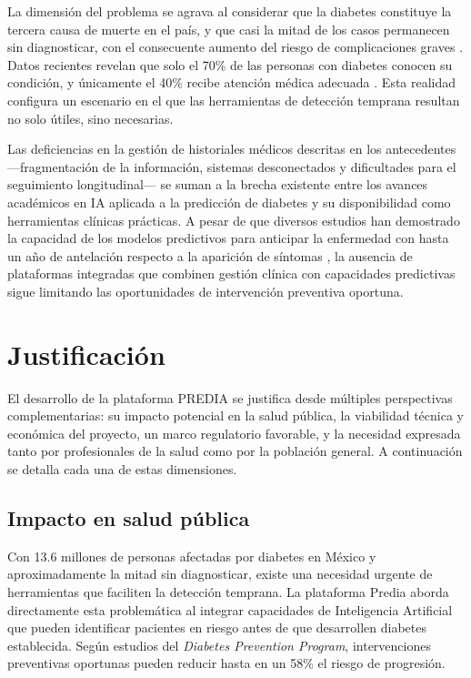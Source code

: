 \documentclass[12pt, letterpaper, twoside]{report}
\begin{document}
La dimensión del problema se agrava al considerar que la diabetes constituye la tercera causa de muerte en el país, y que casi la mitad de los casos permanecen sin diagnosticar, con el consecuente aumento del riesgo de complicaciones graves \citep{basto2021}. Datos recientes revelan que solo el 70\% de las personas con diabetes conocen su condición, y únicamente el 40\% recibe atención médica adecuada \citep{barquera2021}. Esta realidad configura un escenario en el que las herramientas de detección temprana resultan no solo útiles, sino necesarias.

Las deficiencias en la gestión de historiales médicos descritas en los antecedentes ---fragmentación de la información, sistemas desconectados y dificultades para el seguimiento longitudinal--- se suman a la brecha existente entre los avances académicos en IA aplicada a la predicción de diabetes y su disponibilidad como herramientas clínicas prácticas. A pesar de que diversos estudios han demostrado la capacidad de los modelos predictivos para anticipar la enfermedad con hasta un año de antelación respecto a la aparición de síntomas \citep{contreras2018}, la ausencia de plataformas integradas que combinen gestión clínica con capacidades predictivas sigue limitando las oportunidades de intervención preventiva oportuna.

\section{Justificación}

El desarrollo de la plataforma PREDIA se justifica desde múltiples perspectivas complementarias: su impacto potencial en la salud pública, la viabilidad técnica y económica del proyecto, un marco regulatorio favorable, y la necesidad expresada tanto por profesionales de la salud como por la población general. A continuación se detalla cada una de estas dimensiones.

\subsection{Impacto en salud pública}

Con 13.6 millones de personas afectadas por diabetes en México y aproximadamente la mitad sin diagnosticar, existe una necesidad urgente de herramientas que faciliten la detección temprana. La plataforma Predia aborda directamente esta problemática al integrar capacidades de Inteligencia Artificial que pueden identificar pacientes en riesgo antes de que desarrollen diabetes establecida. Según estudios del \textit{Diabetes Prevention Program}, intervenciones preventivas oportunas pueden reducir hasta en un 58\% el riesgo de progresión.
\end{document}

